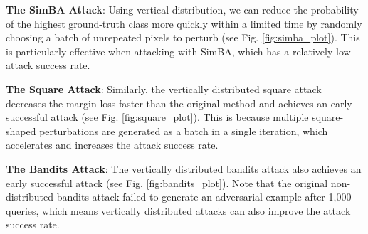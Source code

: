 \textbf{The SimBA Attack}: Using vertical distribution, we can reduce the probability of the highest ground-truth class more quickly within a limited time by randomly choosing a batch of unrepeated pixels to perturb (see Fig. \ref{fig:simba_plot}).  This is particularly effective when attacking with SimBA, which has a relatively low attack success rate. 


\textbf{The Square Attack}: Similarly, the vertically distributed square attack decreases the margin loss faster than the original method and achieves an early successful attack (see Fig. \ref{fig:square_plot}). This is because multiple square-shaped perturbations are generated as a batch in a single iteration, which accelerates and increases the attack success rate. 

\textbf{The Bandits Attack}: The vertically distributed bandits attack also achieves an early successful attack (see Fig. \ref{fig:bandits_plot}). Note that the original non-distributed bandits attack failed to generate an adversarial example after 1,000 queries, which means vertically distributed attacks can also improve the attack success rate.


